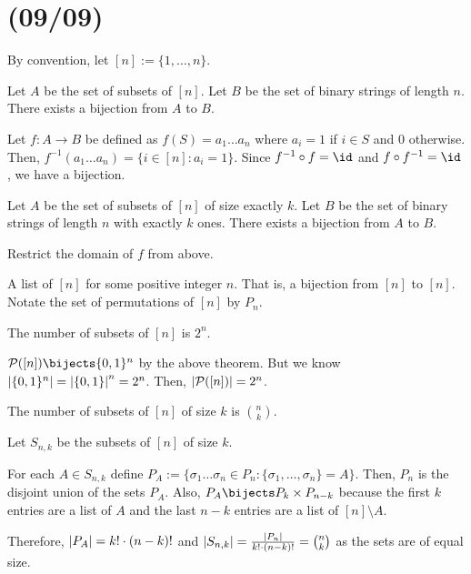\documentclass[class=math239,notes,tikz]{agony}
\begin{document}
\section{(09/09)}

By convention, let $[n] := \{1,\dotsc,n\}$.

\begin{theorem}
  Let $A$ be the set of subsets of $[n]$.
  Let $B$ be the set of binary strings of length $n$.
  There exists a bijection from $A$ to $B$.
\end{theorem}
\begin{prf}
  Let $f : A \to B$ be defined as $f(S) = a_1\dots a_n$
  where $a_i = 1$ if $i \in S$ and $0$ otherwise.
  Then, $f^{-1}(a_1\dots a_n) = \{i \in [n] : a_i = 1\}$.
  Since $f^{-1} \circ f = \id$ and $f \circ f^{-1} = \id$, we have a bijection.
\end{prf}

\begin{theorem}
  Let $A$ be the set of subsets of $[n]$ of size exactly $k$.
  Let $B$ be the set of binary strings of length $n$ with exactly $k$ ones.
  There exists a bijection from $A$ to $B$.
\end{theorem}
\begin{prf}
  Restrict the domain of $f$ from above.
\end{prf}

\begin{defn}[permutation]
  A list of $[n]$ for some positive integer $n$.
  That is, a bijection from $[n]$ to $[n]$.
  Notate the set of permutations of $[n]$ by $P_n$.
\end{defn}

\begin{theorem}[1.3]
  The number of subsets of $[n]$ is $2^n$.
\end{theorem}
\begin{prf}
  $\mathcal{P}([n]) \bijects \{0,1\}^n$ by the above theorem.
  But we know $\abs{\{0,1\}^n} = \abs{\{0,1\}}^n = 2^n$.
  Then, $\abs{\mathcal{P}([n])} = 2^n$.
\end{prf}

\begin{theorem}[1.5]
  The number of subsets of $[n]$ of size $k$ is $\binom{n}{k}$.
\end{theorem}
\begin{prf}
  Let $S_{n,k}$ be the subsets of $[n]$ of size $k$.

  For each $A \in S_{n,k}$ define $P_A := \{\sigma_1\dots\sigma_n \in P_n : \{\sigma_1,\dotsc,\sigma_n\} = A\}$.
  Then, $P_n$ is the disjoint union of the sets $P_A$.
  Also, $P_A \bijects P_k \times P_{n-k}$ because the first $k$ entries are a list of $A$
  and the last $n-k$ entries are a list of $[n] \setminus A$.

  Therefore, $\abs{P_A} = k! \cdot (n-k)!$ and
  $\abs{S_{n,k}} = \frac{\abs{P_n}}{k!\cdot(n-k)!} = \binom{n}{k}$
  as the sets are of equal size.
\end{prf}
\end{document}
